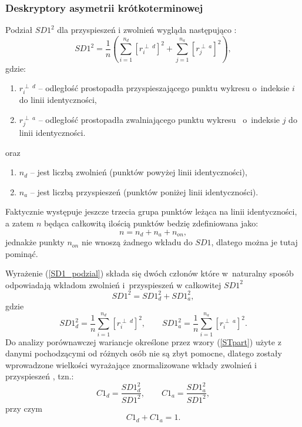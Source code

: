 \subsubsection{Deskryptory asymetrii krótkoterminowej}
Podział $SD1^2$ dla przyspieszeń i zwolnień wygląda następująco \cite{biomed, geomasy, annals, berlinJa}:
\begin{equation}
SD1^2=\frac{1}{n}\left(\sum_{i=1}^{n_{d}}[r^{\perp\;d}_{i}]^{2}+\sum_{j=1}^{n_{a}}[r^{\perp\;a}_{j}]^{2}\right),\label{SD1_podzial}
\end{equation}
gdzie:
\begin{enumerate}
\item[]$r^{\perp\;d}_{i}$ -- odległość prostopadła przyspieszającego punktu  wykresu \linebreak \PP{} o~indeksie $i$ do linii identyczności,
\item[]$r^{\perp\;a}_{j}$ -- odległość prostopadła zwalniającego punktu wykresu \PP\ o~indeksie $j$ do linii identyczności.
\end{enumerate}
oraz
\begin{enumerate}
\item[]$n_{d}$ -- jest liczbą zwolnień (punktów powyżej linii identyczności),
\item[]$n_{a}$ -- jest liczbą przyspieszeń (punktów poniżej linii identyczności).
\end{enumerate}
Faktycznie występuje jeszcze trzecia grupa punktów leżąca na linii identyczności, a zatem
$n$ będąca całkowitą ilością punktów bedzię zdefiniowana jako:
\begin{equation}
n=n_{d}+n_{a}+n_{on} \label{nki},
\end{equation}
jednakże punkty $n_{on}$ nie wnoszą żadnego wkładu do $SD1$, dlatego można je tutaj pominąć.

Wyrażenie (\ref{SD1_podzial}) składa się dwóch członów które w~naturalny sposób odpowiadają
wkładom zwolnień i~przyspieszeń w całkowitej $SD1^{2}$ 
\begin{equation}
SD1^{2}=SD1_{d}^{2}+SD1_{a}^{2}\label{SD1par},
\end{equation}
gdzie
\begin{equation}
SD1_{d}^{2}=\frac{1}{n}\sum_{i=1}^{n_{d}}[r^{\perp\;d}_{i}]^{2}, \qquad SD1_{a}^{2}=\frac{1}{n}\sum_{i=1}^{n_{a}}[r^{\perp\;a}_{i}]^{2}. \label{STpart}
\end{equation}
Do analizy porównawczej wariancje określone przez wzory (\ref{STpart}) użyte z danymi
pochodzącymi od różnych osób nie są zbyt pomocne, dlatego zostały wprowadzone wielkości
wyrażające znormalizowane wkłady zwolnień i przyspieszeń \cite{geomasy, annals, berlinJa}, tzn.:
\begin{equation}
C1_{d}=\frac{SD1_{d}^{2}}{SD1^{2}}, \qquad C1_{a}=\frac{SD1_{a}^{2}}{SD1^{2}},\label{STnorm}
\end{equation}
przy czym
\begin{equation}
C1_{d}+C1_{a}=1.
\end{equation}

